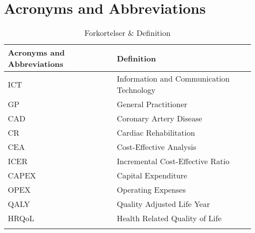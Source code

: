 \chapter{Acronyms and Abbreviations}


\begin{longtabu} to 
	\textbf{Acronyms and Abbreviations} & \textbf{Definition}\\[-1ex]
	\midrule
	ICT & Information and Communication Technology \\[-1ex]
	GP & General Practitioner \\[-1ex]
	CAD & Coronary Artery Disease \\[-1ex]
	CR & Cardiac Rehabilitation \\[-1ex]
	CEA & Cost-Effective Analysis \\[-1ex]
	ICER & Incremental Cost-Effective Ratio \\[-1ex]
	CAPEX & Capital Expenditure \\[-1ex]
	OPEX & Operating Expenses \\[-1ex]
	QALY & Quality Adjusted Life Year \\[-1ex]
	HRQoL & Health Related Quality of Life \\[-1ex]
	\caption{Forkortelser \& Definition}
\end{longtabu}



